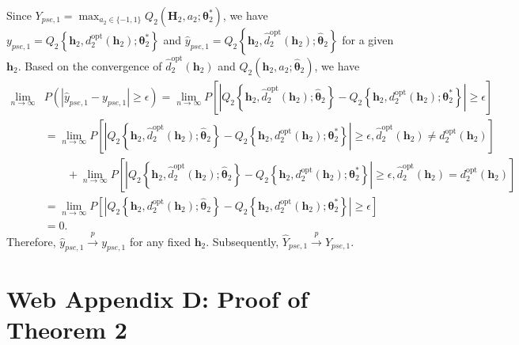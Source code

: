\documentclass[12pt]{article}
\begin{document}
Since $Y_{pse,1} = \max _{a_{2} \in \{-1,1\}} Q_{2}\left(\bm{H}_{2}, a_{2};\bm{\theta}_2^*\right)$, we have $y_{pse,1} =  Q_{2}\left\{\bm{h}_{2}, d_2^{\mathrm{opt}}(\bm{h}_2);\bm{\theta}_2^*\right\}$ and $\widehat{y}_{pse,1} =  Q_{2}\left\{\bm{h}_{2}, \widehat{d}_2^{\mathrm{opt}}(\bm{h}_2);\widehat{\bm{\theta}}_2\right\}$ for a given $\bm{h}_2$. Based on the convergence of $\widehat{d}_2^{\mathrm{opt}}(\bm{h}_2)$ and $Q_2(\bm{h}_2,a_2;\widehat{\bm{\theta}}_2)$, we have
\begin{align*}
    \lim\limits_{n\to \infty}& P(|\widehat{y}_{pse,1}-y_{pse,1}|\geq \epsilon) = \lim\limits_{n\to \infty} P\left[\left|Q_2\left\{\bm{h}_2,\widehat{d}_2^{\mathrm{opt}}(\bm{h}_2);\widehat{\bm{\theta}}_2\right\}-Q_2\left\{\bm{h}_2,d_2^{\mathrm{opt}}(\bm{h}_2);\bm{\theta}_2^*\right\}\right|\geq \epsilon \right]\\
    &= \lim\limits_{n\to \infty} P\left[\left|Q_2\left\{\bm{h}_2,\widehat{d}_2^{\mathrm{opt}}(\bm{h}_2);\widehat{\bm{\theta}}_2\right\}-Q_2\left\{\bm{h}_2,d_2^{\mathrm{opt}}(\bm{h}_2);\bm{\theta}_2^*\right\}\right|\geq \epsilon, \widehat{d}_2^{\mathrm{opt}}(\bm{h}_2) \neq d_2^{\mathrm{opt}}(\bm{h}_2) \right] \\
    &\qquad + \lim\limits_{n\to \infty} P\left[ \left|Q_2\left\{\bm{h}_2,\widehat{d}_2^{\mathrm{opt}}(\bm{h}_2);\widehat{\bm{\theta}}_2\right\}-Q_2\left\{\bm{h}_2,d_2^{\mathrm{opt}}(\bm{h}_2);\bm{\theta}_2^*\right\}\right|\geq \epsilon, \widehat{d}_2^{\mathrm{opt}}(\bm{h}_2) = d_2^{\mathrm{opt}}(\bm{h}_2) \right]\\
    &= \lim\limits_{n\to \infty} P\left[ \left|Q_2\left\{\bm{h}_2,d_2^{\mathrm{opt}}(\bm{h}_2);\widehat{\bm{\theta}}_2\right\}-Q_2\left\{\bm{h}_2,d_2^{\mathrm{opt}}(\bm{h}_2);\bm{\theta}_2^*\right\}\right|\geq \epsilon \right]\\
    &=0.
\end{align*}
Therefore, $\widehat{y}_{pse,1} \stackrel{p}{\longrightarrow} y_{pse,1}$ for any fixed $\bm{h}_2$. Subsequently, $\widehat{Y}_{pse,1} \stackrel{p}{\longrightarrow} Y_{pse,1}$.


\section{Web Appendix D: Proof of Theorem 2}
\end{document}
